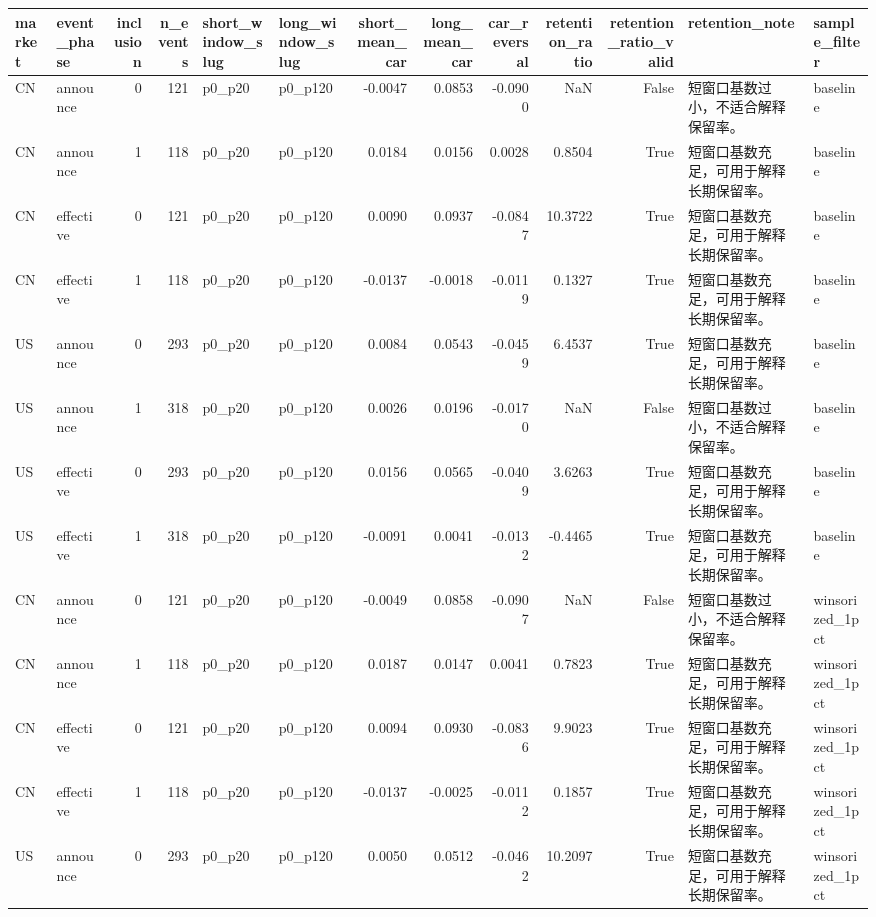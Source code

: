 \begin{tabular}{llrrllrrrrrll}
\toprule
market & event_phase & inclusion & n_events & short_window_slug & long_window_slug & short_mean_car & long_mean_car & car_reversal & retention_ratio & retention_ratio_valid & retention_note & sample_filter \\
\midrule
CN & announce & 0 & 121 & p0_p20 & p0_p120 & -0.0047 & 0.0853 & -0.0900 & NaN & False & 短窗口基数过小，不适合解释保留率。 & baseline \\
CN & announce & 1 & 118 & p0_p20 & p0_p120 & 0.0184 & 0.0156 & 0.0028 & 0.8504 & True & 短窗口基数充足，可用于解释长期保留率。 & baseline \\
CN & effective & 0 & 121 & p0_p20 & p0_p120 & 0.0090 & 0.0937 & -0.0847 & 10.3722 & True & 短窗口基数充足，可用于解释长期保留率。 & baseline \\
CN & effective & 1 & 118 & p0_p20 & p0_p120 & -0.0137 & -0.0018 & -0.0119 & 0.1327 & True & 短窗口基数充足，可用于解释长期保留率。 & baseline \\
US & announce & 0 & 293 & p0_p20 & p0_p120 & 0.0084 & 0.0543 & -0.0459 & 6.4537 & True & 短窗口基数充足，可用于解释长期保留率。 & baseline \\
US & announce & 1 & 318 & p0_p20 & p0_p120 & 0.0026 & 0.0196 & -0.0170 & NaN & False & 短窗口基数过小，不适合解释保留率。 & baseline \\
US & effective & 0 & 293 & p0_p20 & p0_p120 & 0.0156 & 0.0565 & -0.0409 & 3.6263 & True & 短窗口基数充足，可用于解释长期保留率。 & baseline \\
US & effective & 1 & 318 & p0_p20 & p0_p120 & -0.0091 & 0.0041 & -0.0132 & -0.4465 & True & 短窗口基数充足，可用于解释长期保留率。 & baseline \\
CN & announce & 0 & 121 & p0_p20 & p0_p120 & -0.0049 & 0.0858 & -0.0907 & NaN & False & 短窗口基数过小，不适合解释保留率。 & winsorized_1pct \\
CN & announce & 1 & 118 & p0_p20 & p0_p120 & 0.0187 & 0.0147 & 0.0041 & 0.7823 & True & 短窗口基数充足，可用于解释长期保留率。 & winsorized_1pct \\
CN & effective & 0 & 121 & p0_p20 & p0_p120 & 0.0094 & 0.0930 & -0.0836 & 9.9023 & True & 短窗口基数充足，可用于解释长期保留率。 & winsorized_1pct \\
CN & effective & 1 & 118 & p0_p20 & p0_p120 & -0.0137 & -0.0025 & -0.0112 & 0.1857 & True & 短窗口基数充足，可用于解释长期保留率。 & winsorized_1pct \\
US & announce & 0 & 293 & p0_p20 & p0_p120 & 0.0050 & 0.0512 & -0.0462 & 10.2097 & True & 短窗口基数充足，可用于解释长期保留率。 & winsorized_1pct \\

\end{tabular}

